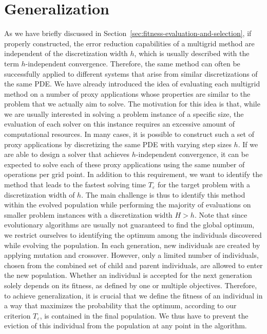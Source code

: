 \section{Generalization}
\label{sec:generalization}
As we have briefly discussed in Section~\ref{sec:fitness-evaluation-and-selection}, if properly constructed, the error reduction capabilities of a multigrid method are independent of the discretization width $h$, which is usually described with the term $h$-independent convergence.
Therefore, the same method can often be successfully applied to different systems that arise from similar discretizations of the same PDE.
We have already introduced the idea of evaluating each multigrid method on a number of proxy applications whose properties are similar to the problem that we actually aim to solve.
The motivation for this idea is that, while we are usually interested in solving a problem instance of a specific size, the evaluation of each solver on this instance requires an excessive amount of computational resources.
In many cases, it is possible to construct such a set of proxy applications by discretizing the same PDE with varying step sizes $h$.
If we are able to design a solver that achieves $h$-independent convergence, it can be expected to solve each of these proxy applications using the same number of operations per grid point.
In addition to this requirement, we want to identify the method that leads to the fastest solving time $T_\varepsilon$ for the target problem with a discretization width of $h$.
The main challenge is thus to identify this method within the evolved population while performing the majority of evaluations on smaller problem instances with a discretization width $H > h$.
Note that since evolutionary algorithms are usually not guaranteed to find the global optimum, we restrict ourselves to identifying the optimum among the individuals discovered while evolving the population.
In each generation, new individuals are created by applying mutation and crossover.
However, only a limited number of individuals, chosen from the combined set of child and parent individuals, are allowed to enter the new population.
Whether an individual is accepted for the next generation solely depends on its fitness, as defined by one or multiple objectives.
Therefore, to achieve generalization, it is crucial that we define the fitness of an individual in a way that maximizes the probability that the optimum, according to our criterion $T_{\varepsilon}$, is contained in the final population.
We thus have to prevent the eviction of this individual from the population at any point in the algorithm.

